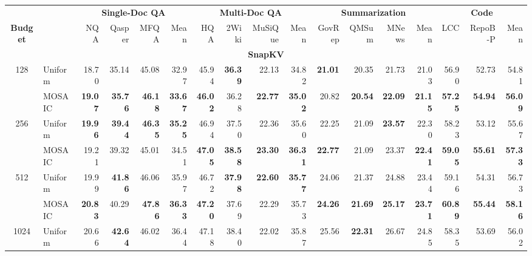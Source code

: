 \begin{table}[tp]
  \centering
  \scriptsize
  \setlength{\tabcolsep}{3pt}
  \renewcommand{\arraystretch}{0.92}
  \begin{tabular}{@{} c l rrrr rrrr rrrr rrr @{}}
    \toprule
    & & \multicolumn{4}{c}{\textbf{Single-Doc QA}} & \multicolumn{4}{c}{\textbf{Multi-Doc QA}} & \multicolumn{4}{c}{\textbf{Summarization}} & \multicolumn{3}{c}{\textbf{Code}} \\
    \cmidrule(lr){3-6} \cmidrule(lr){7-10} \cmidrule(lr){11-14} \cmidrule(lr){15-17}
    \textbf{Budget} & & NQA & Qasper & MFQA & Mean & HQA & 2Wiki & MuSiQue & Mean & GovRep & QMSum & MNews & Mean & LCC & RepoB-P & Mean \\
    \midrule
    \multicolumn{17}{c}{\textbf{SnapKV}} \\
    \midrule
    \multirow{2}{*}{128} & Uniform & 18.70 & 35.14 & 45.08 & 32.97 & 45.94 & \textbf{36.39} & 22.13 & 34.82 & \textbf{21.01} & 20.35 & 21.73 & 21.03 & 56.90 & 52.73 & 54.81 \\
     & MOSAIC & \textbf{19.07} & \textbf{35.76} & \textbf{46.18} & \textbf{33.67} & \textbf{46.02} & 36.28 & \textbf{22.77} & \textbf{35.02} & 20.82 & \textbf{20.54} & \textbf{22.09} & \textbf{21.15} & \textbf{57.25} & \textbf{54.94} & \textbf{56.09} \\
    \cmidrule(l){1-17}
    \multirow{2}{*}{256} & Uniform & \textbf{19.96} & \textbf{39.44} & \textbf{46.35} & \textbf{35.25} & 46.94 & 37.50 & 22.36 & 35.60 & 22.25 & 21.09 & \textbf{23.57} & 22.30 & 58.23 & 53.12 & 55.67 \\
     & MOSAIC & 19.21 & 39.32 & 45.01 & 34.51 & \textbf{47.05} & \textbf{38.58} & \textbf{23.30} & \textbf{36.31} & \textbf{22.77} & 21.09 & 23.37 & \textbf{22.41} & \textbf{59.05} & \textbf{55.61} & \textbf{57.33} \\
    \cmidrule(l){1-17}
    \multirow{2}{*}{512} & Uniform & 19.99 & \textbf{41.86} & 46.06 & 35.97 & 46.72 & \textbf{37.98} & \textbf{22.60} & \textbf{35.77} & 24.06 & 21.37 & 24.88 & 23.44 & 59.16 & 54.31 & 56.73 \\
     & MOSAIC & \textbf{20.83} & 40.29 & \textbf{47.86} & \textbf{36.33} & \textbf{47.20} & 37.69 & 22.29 & 35.73 & \textbf{24.26} & \textbf{21.69} & \textbf{25.17} & \textbf{23.71} & \textbf{60.89} & \textbf{55.44} & \textbf{58.16} \\
    \cmidrule(l){1-17}
    \multirow{2}{*}{1024} & Uniform & 20.66 & \textbf{42.64} & 46.02 & 36.44 & 47.18 & 38.40 & 22.02 & 35.87 & 25.56 & \textbf{22.31} & 26.67 & 24.85 & 58.35 & 53.69 & 56.02 \\

\end{tabular}
\end{table}
